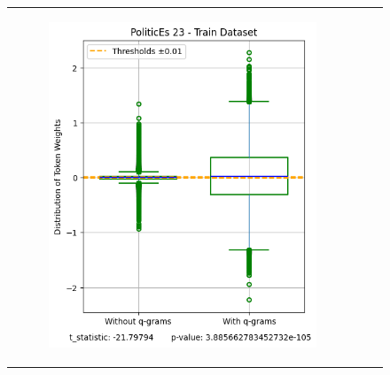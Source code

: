 \documentclass[runningheads,10pt]{llncs}
\begin{document}
\begin{figure}[t]
\begin{tabular}{c c c}
\begin{subfigure}{0.32\textwidth}
            \includegraphics[width=\linewidth]{fig_politicses_23_train.png}
            \label{fig:image3}
        \end{subfigure}
    \end{tabular}

    \vspace{0.15cm}


\end{figure}
\end{document}
